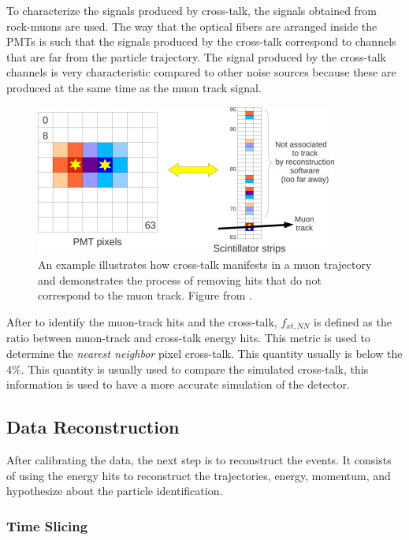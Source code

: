 \begin{itemize}
    To characterize the signals produced by cross-talk, the signals obtained from rock-muons are used. The way that the optical fibers are arranged inside the PMTs is such that the signals produced by the cross-talk correspond to channels that are far from the particle trajectory. The signal produced by the cross-talk channels is very characteristic compared to other noise sources because these are produced at the same time as the muon track signal.

    \begin{figure}[!htb]
        \centering
        \includegraphics{Figures/Chapter2/CrossTallkExample.jpg}
        \caption{An example illustrates how cross-talk manifests in a muon trajectory and demonstrates the process of removing hits that do not correspond to the muon track. Figure from \cite{MINERvA}.}
        \label{fig:Chapter2:CrossTallkExample}
    \end{figure}
    After to identify the muon-track hits and the cross-talk, $f_{xt,NN}$ is defined as the ratio between muon-track and cross-talk energy hits. This metric is used to determine the \textit{nearest neighbor} pixel cross-talk. This quantity usually is below the 4\%. This quantity is usually used to compare the simulated cross-talk, this information is used to have a more accurate simulation of the detector.  
    
\end{itemize}

\pagebreak


\subsection{Data Reconstruction}
\label{Cap:MnvExp:MnvDetector:DataReconstruction}

After calibrating the data, the next step is to reconstruct the events. It consists of using the energy hits to reconstruct the trajectories, energy, momentum, and hypothesize about the particle identification. 

\subsubsection{Time Slicing}
\label{Cap:MnvExp:MnvDetector:DataReconstruction:TimeSlicing}

